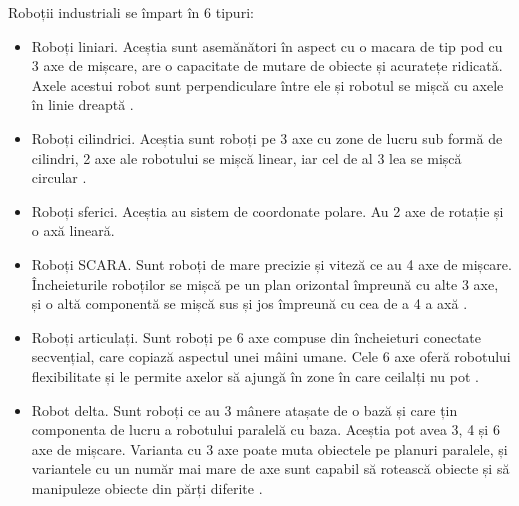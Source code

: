 Roboții industriali se împart în 6 tipuri:
\begin{itemize}
	\item Roboți liniari. Aceștia sunt asemănători în  aspect cu o macara de tip pod cu 3 axe de mișcare, are o capacitate de mutare de obiecte și acuratețe ridicată. Axele acestui robot sunt perpendiculare între ele și robotul se mișcă cu axele în linie dreaptă \cite{ri1}.
	\item Roboți cilindrici. Aceștia sunt roboți pe 3 axe cu zone de lucru sub formă de cilindri, 2 axe ale robotului se mișcă linear, iar cel de al 3 lea se mișcă circular \cite{ri1}.
	\item Roboți sferici. Aceștia au sistem de coordonate polare. Au 2 axe de rotație și o axă lineară.
	\item Roboți SCARA. Sunt roboți de mare precizie și viteză ce au 4 axe de mișcare. Încheieturile roboților se mișcă pe un plan orizontal împreună cu alte 3 axe, și o altă componentă se mișcă sus și jos împreună cu cea de a 4 a axă \cite{ri1}.
	\item Roboți articulați. Sunt roboți pe 6 axe compuse din încheieturi conectate secvențial, care copiază aspectul unei mâini umane. Cele 6 axe oferă robotului flexibilitate și le permite axelor să ajungă în zone în care ceilalți nu pot \cite{ri1}.
	\item Robot delta. Sunt roboți ce au 3 mânere atașate de o bază și care țin componenta de lucru a robotului paralelă cu baza. Aceștia pot avea 3, 4 și 6 axe de mișcare. Varianta cu 3 axe poate muta obiectele pe planuri paralele, și variantele cu un număr mai mare de axe sunt capabil să rotească obiecte și să manipuleze obiecte din părți diferite \cite{ri1}.
\end{itemize}








